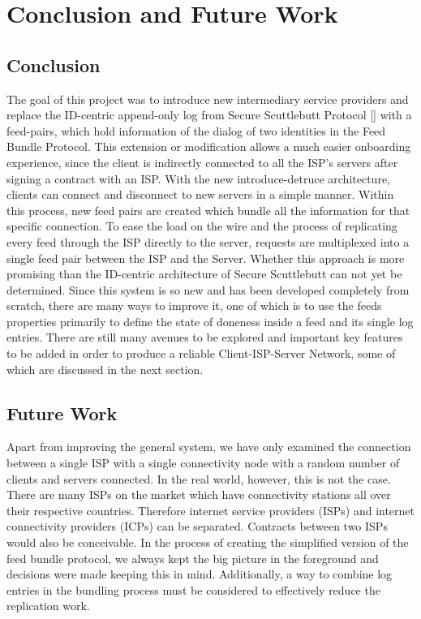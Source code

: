 \chapter{Conclusion and Future Work}
\section{Conclusion}
The goal of this project was to introduce new intermediary service providers and replace the ID-centric append-only log from Secure Scuttlebutt Protocol [] with a feed-pairs, which hold information of the dialog of two identities in the Feed Bundle Protocol. This extension or modification allows a much easier onboarding experience, since the client is indirectly connected to all the ISP’s servers after signing a contract with an ISP. With the new introduce-detruce architecture, clients can connect and disconnect to new servers in a simple manner. Within this process, new feed pairs are created which bundle all the information for that specific connection. To ease the load on the wire and the process of replicating every feed through the ISP directly to the server, requests are multiplexed into a single feed pair between the ISP and the Server. Whether this approach is more promising than the ID-centric architecture of Secure Scuttlebutt can not yet be determined. Since this system is so new and has been developed completely from scratch, there are many ways to improve it, one of which is to use the feeds properties primarily to define the state of doneness inside a feed and its single log entries. There are still many avenues to be explored and important key features to be added in order to produce a reliable Client-ISP-Server Network, some of which are discussed in the next section.

\section{Future Work}
Apart from improving the general system, we have only examined the connection between a single ISP with a single connectivity node with a random number of clients and servers connected. In the real world, however, this is not the case. There are many ISPs on the market which have connectivity stations all over their respective countries. Therefore internet service providers (ISPs) and internet connectivity providers (ICPs) can be separated. Contracts between two ISPs would also be conceivable. In the process of creating the simplified version of the feed bundle protocol, we always kept the big picture in the foreground and decisions were made keeping this in mind. Additionally, a way to combine log entries in the bundling process must be considered to effectively reduce the replication work.

